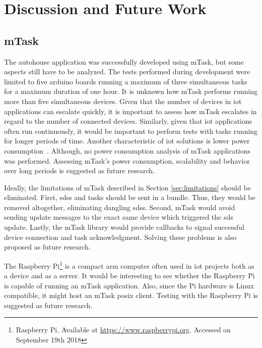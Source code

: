 \section{Discussion and Future Work}

\subsection{mTask}

The \gls{autohouse} application was successfully developed using \gls{mTask}, but some aspects still have to be analyzed. The tests performed during development were limited to five \gls{arduino} boards running a maximum of three simultaneous tasks for a maximum duration of one hour. It is unknown how \gls{mTask} performs running more than five simultaneous devices. Given that the number of devices in \acs{iot} applications can escalate quickly, it is important to assess how \gls{mTask} escalates in regard to the number of connected devices. Similarly, given that \acs{iot} applications often run continuously, it would be important to perform tests with tasks running for longer periods of time. Another characteristic of \acs{iot} solutions is lower power consumption~\cite{survey,survey2,survey3}. Although, no power consumption analysis of \gls{mTask} applications was performed. Assessing \gls{mTask}'s power consumption, scalability and behavior over long periods is suggested as future research. 

Ideally, the limitations of \gls{mTask} described in Section \ref{sec:limitations} should be eliminated. First, \acsp{sds} and tasks should be sent in a bundle. Thus, they would be removed altogether, eliminating dangling \acsp{sds}. Second, \gls{mTask} would avoid sending update messages to the exact same device which triggered the \acs{sds} update. Lastly, the \gls{mTask} library would provide callbacks to signal successful device connection and task acknowledgment. Solving these problems is also proposed as future research.

The Raspberry Pi\footnote{Raspberry Pi. Available at \url{https://www.raspberrypi.org}. Accessed on September 19th 2018} is a compact \acs{arm} computer often used in \acs{iot} projects both as a device and as a server. It would be interesting to see whether the Raspberry Pi is capable of running an \gls{mTask} application. Also, since the Pi hardware is Linux compatible, it might host an \gls{mTask} \acs{posix} client. Testing with the Raspberry Pi is suggested as future research.

